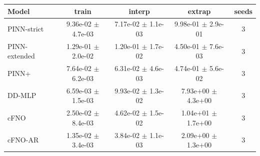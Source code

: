 \begin{tabular}{lcccc}
\toprule
Model & train & interp & extrap & seeds \\
\midrule
PINN-strict & 9.36e-02 $\pm$ 4.7e-03 & 7.17e-02 $\pm$ 1.1e-03 & 9.98e-01 $\pm$ 2.9e-01 & 3 \\
PINN-extended & 1.29e-01 $\pm$ 2.0e-02 & 1.20e-01 $\pm$ 1.7e-02 & 4.50e-01 $\pm$ 7.6e-03 & 3 \\
PINN+ & 7.64e-02 $\pm$ 6.2e-03 & 6.31e-02 $\pm$ 4.6e-03 & 4.74e-01 $\pm$ 5.6e-02 & 3 \\
DD-MLP & 6.59e-03 $\pm$ 1.5e-03 & 9.93e-02 $\pm$ 1.3e-02 & 7.93e+00 $\pm$ 4.3e+00 & 3 \\
cFNO & 2.50e-02 $\pm$ 8.4e-03 & 4.62e-02 $\pm$ 1.5e-02 & 1.04e+01 $\pm$ 1.7e+00 & 3 \\
cFNO-AR & 1.35e-02 $\pm$ 3.4e-03 & 3.84e-02 $\pm$ 1.1e-03 & 2.09e+00 $\pm$ 1.3e+00 & 3 \\
\bottomrule
\end{tabular}
